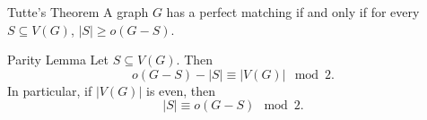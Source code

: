 \documentclass[co342]{subfiles}
\begin{document}
    \begin{theorem}{Tutte's Theorem}
        A graph $G$ has a perfect matching if and only if for every $S\subseteq V\left( G \right)$, $\left| S \right|\geq o\left( G-S \right)$.
    \end{theorem}

    \begin{lemma_inside}{Parity Lemma}
        Let $S\subseteq V\left( G \right)$. Then
        \begin{equation*}
            o\left( G-S \right)-\left| S \right|\equiv \left| V\left( G \right) \right|\mod 2.
        \end{equation*}
        In particular, if $\left| V\left( G \right) \right|$ is even, then 
        \begin{equation*}
            \left| S \right|\equiv o\left( G-S \right)\mod 2.
        \end{equation*}
    \end{lemma_inside}
\end{document}
